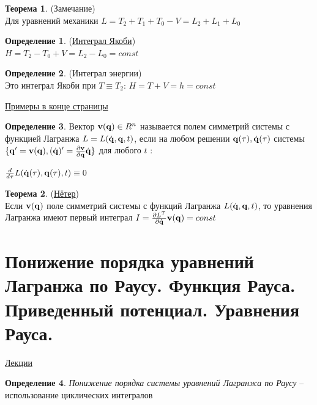 \documentclass[specialist, subf, href, colorlinks=true, 12pt, times, mtpro, final]{disser}
\theoremstyle{definition}
\newtheorem{defn}{Определение}[section]
\newtheorem{theorem}{Теорема}[section]
\begin{document}
    \begin{theorem}(Замечание)\\
   		Для уравнений механики $L = T_2+T_1+T_0-V=L_2+L_1+L_0$
    \end{theorem}
    \begin{defn} (\hyperlink {lects.1}{Интеграл Якоби})\\
    	$H=T_2-T_0+V=L_2-L_0=const$ 
    \end{defn}
    \begin{defn} (Интеграл энергии)\\
    	Это интеграл Якоби при $T \equiv T_2$: $H=T+V=h=const$\\
    \end{defn}
    
    \noindent\hyperlink {lects.1}{Примеры в конце страницы}\\
    
    \begin{defn}
    	Вектор $\mathbf{v}(\mathbf{q}) \in R^n$ называется полем симметрий системы с функцией Лагранжа $L=L(\dot{\mathbf{q}}, \mathbf{q}, t)$, если на любом решении $\mathbf{q}(\tau), \dot{\mathbf{q}}(\tau)$ системы $\{\mathbf{q}' = \mathbf{v}(\mathbf{q}), (\dot{\mathbf{q}})'=\frac{\partial \mathbf{v}}{\partial \mathbf{q}} \dot{\mathbf{q}}\}$ для любого $t$ :\\
    	\begin{center}
    	$\frac{d}{d\tau} L (\dot{\mathbf{q}}(\tau), \mathbf{q}(\tau), t) \equiv 0$
    	\end{center}
    \end{defn}
    
    \begin{theorem}(\hyperlink {lects.2}{Нётер})\\
    Если $\mathbf{v}(\mathbf{q})$ поле симметрий системы с функций Лагранжа $L(\dot{\mathbf{q}}, \mathbf{q}, t)$, то уравнения Лагранжа имеют первый интеграл $I=\frac{\partial L^T}{\partial \dot{\mathbf{q}}} \mathbf{v}(\mathbf{q}) = const$
    \end{theorem}
    
    
    
    \section{Понижение порядка уравнений Лагранжа по Раусу. Функция Рауса. Приведенный потенциал. Уравнения Рауса.}
     \label{9}
    \hyperlink {lects.3}{Лекции} \\
    
    \begin{defn} 
    { \it Понижение порядка системы уравнений Лагранжа по Раусу} \---
    	использование циклических интегралов\\
    \end{defn}
    
\end{document}
